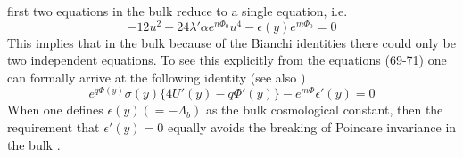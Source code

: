 \documentclass[a4paper,12pt]{article}
\newcommand {\nn} {\nonumber}
\begin{document}
first two equations in the bulk reduce to a single equation, i.e.
\begin{equation}
-12u^2+24\lambda'\alpha e^{n\Phi_0}u^4-\epsilon(y) e^{m\Phi_0}=0\nn
\end{equation}
This implies that in the bulk because of the Bianchi identities there 
could only be two independent equations. To see this explicitly from the 
equations (69-71) one can formally arrive at the following identity (see 
also \cite{NIC})  
\begin{equation}
e^{q\Phi(y)}\sigma(y)\big\{4U'(y)-q\Phi'(y)\big\}-e^{m\Phi}\epsilon'(y)=0
\end{equation}
When one defines $\epsilon(y)(=-\Lambda_b)$ as the bulk cosmological 
constant, then the requirement that $\epsilon'(y)=0$ equally avoids the 
breaking of Poincare invariance in the bulk \cite{RS1,VAR,NIC}.
\end{document}
